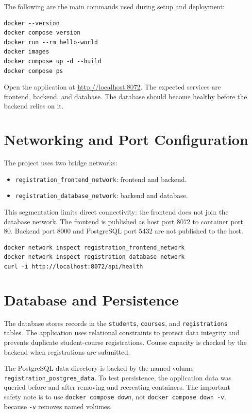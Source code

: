 \documentclass[11pt,a4paper]{article}
\begin{document}
The following are the main commands used during setup and deployment:

\begin{lstlisting}
docker --version
docker compose version
docker run --rm hello-world
docker images
docker compose up -d --build
docker compose ps
\end{lstlisting}

Open the application at \url{http://localhost:8072}. The expected services are frontend, backend, and database. The database should become healthy before the backend relies on it.

\section{Networking and Port Configuration}
The project uses two bridge networks:
\begin{itemize}[leftmargin=*]
  \item \texttt{registration\_frontend\_network}: frontend and backend.
  \item \texttt{registration\_database\_network}: backend and database.
\end{itemize}
This segmentation limits direct connectivity: the frontend does not join the database network. The frontend is published as host port 8072 to container port 80. Backend port 8000 and PostgreSQL port 5432 are not published to the host.

\begin{lstlisting}
docker network inspect registration_frontend_network
docker network inspect registration_database_network
curl -i http://localhost:8072/api/health
\end{lstlisting}

\section{Database and Persistence}
The database stores records in the \texttt{students}, \texttt{courses}, and \texttt{registrations} tables. The application uses relational constraints to protect data integrity and prevents duplicate student-course registrations. Course capacity is checked by the backend when registrations are submitted.

The PostgreSQL data directory is backed by the named volume \texttt{registration\_postgres\_data}. To test persistence, the application data was queried before and after removing and recreating containers. The important safety note is to use \texttt{docker compose down}, not \texttt{docker compose down -v}, because \texttt{-v} removes named volumes.
\end{document}

